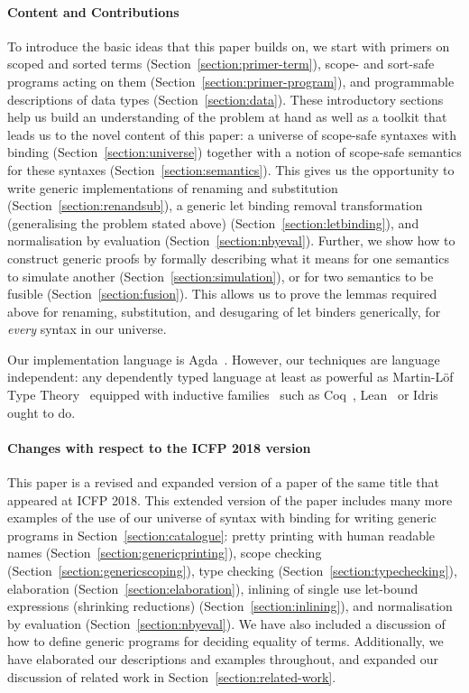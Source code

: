 \paragraph*{Content and Contributions}
To introduce the basic ideas that this paper builds on, we start with
primers on scoped and sorted terms
(Section~\ref{section:primer-term}), scope- and sort-safe programs
acting on them (Section~\ref{section:primer-program}), and
programmable descriptions of data types (Section~\ref{section:data}).
These introductory sections help us build an understanding of the
problem at hand as well as a toolkit that leads us to the novel
content of this paper: a universe of scope-safe syntaxes with binding
(Section~\ref{section:universe}) together with a notion of scope-safe
semantics for these syntaxes (Section~\ref{section:semantics}).  This
gives us the opportunity to write generic implementations of renaming
and substitution (Section~\ref{section:renandsub}), a generic
let binding removal transformation (generalising the problem stated
above) (Section~\ref{section:letbinding}), and normalisation by
evaluation (Section~\ref{section:nbyeval}). Further, we show how to
construct generic proofs by formally describing what it means for one
semantics to simulate another (Section~\ref{section:simulation}), or
for two semantics to be fusible (Section~\ref{section:fusion}). This
allows us to prove the lemmas required above for renaming,
substitution, and desugaring of let binders generically, for
\emph{every} syntax in our universe.

\medskip

Our implementation language is
Agda~\cite{norell2009dependently}. However, our techniques are
language independent: any dependently typed language at least as
powerful as Martin-L\"of Type Theory~\cite{martin1982constructive}
equipped with inductive families~\cite{dybjer1994inductive} such as
Coq~\cite{Coq:manual}, Lean~\cite{DBLP:conf/cade/MouraKADR15} or
Idris~\cite{brady2013idris} ought to do.

\medskip

\paragraph*{Changes with respect to the ICFP 2018 version} This paper
is a revised and expanded version of a paper of the same title that
appeared at ICFP 2018. This extended version of the paper includes
many more examples of the use of our universe of syntax with binding
for writing generic programs in Section~\ref{section:catalogue}:
pretty printing with human readable names
(Section~\ref{section:genericprinting}), scope checking
(Section~\ref{section:genericscoping}), type checking
(Section~\ref{section:typechecking}), elaboration
(Section~\ref{section:elaboration}), inlining of single use let-bound
expressions (shrinking reductions) (Section~\ref{section:inlining}),
and normalisation by evaluation (Section~\ref{section:nbyeval}). We
have also included a discussion of how to define generic programs for
deciding equality of terms. Additionally, we have elaborated our
descriptions and examples throughout, and expanded our discussion of
related work in Section~\ref{section:related-work}.


